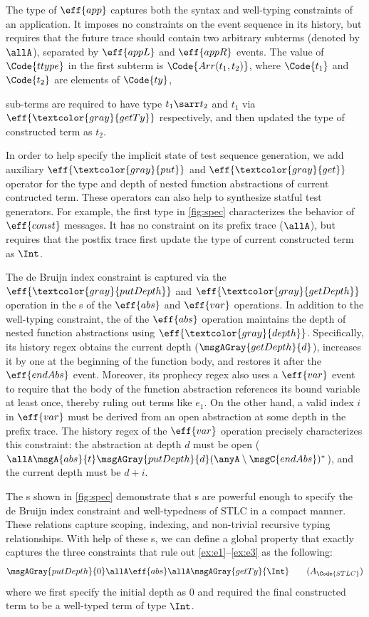 The type
of $\eff{app}$ captures
both the syntax and well-typing constraints of an application.
It imposes no constraints on the event sequence in its history,
but requires that the future trace should contain two arbitrary
subterms (denoted by $\allA$), separated by
$\eff{appL}$ and $\eff{appR}$ events.   The value of
$\Code{ttype}$ in the first subterm is $\Code{Arr(t_1,t_2)}$,
where $\Code{t_1}$ and $\Code{t_2}$ are elements of $\Code{ty}$,

sub-terms are required to have type $t_1\sarr t_2$ and $t_1$ via
$\eff{\textcolor{gray}{getTy}}$ respectively, and then updated the
type of constructed term as $t_2$.


In
order to help specify the implicit state of test sequence generation,
we add auxiliary $\eff{\textcolor{gray}{put}}$ and
$\eff{\textcolor{gray}{get}}$ operator for the type and depth of
nested function abstractions of current contructed term. These
operators can also help to synthesize statful test generators.  For
example, the first type in \autoref{fig:spec} characterizes the
behavior of $\eff{const}$ messages. It has no constraint on its prefix
trace ($\allA$), but requires that the postfix trace first update the
type of current constructed term as $\Int$.

The de Bruijn index constraint is captured via the $\eff{\textcolor{gray}{putDepth}}$ and $\eff{\textcolor{gray}{getDepth}}$ operation in the \PAT{}s of the $\eff{abs}$ and $\eff{var}$ operations. In addition to the well-typing constraint, the \PAT{} of the $\eff{abs}$ operation maintains the depth of nested function abstractions using $\eff{\textcolor{gray}{depth}}$. Specifically, its history regex obtains the current depth ($\msgAGray{getDepth}{d}$), increases it by one at the beginning of the function body, and restores it after the $\eff{endAbs}$ event. Moreover, its prophecy regex also uses a $\eff{var}$ event to require that the body of the function abstraction references its bound variable at least once, thereby ruling out terms like $e_1$.
On the other hand, a valid index $i$ in $\eff{var}$ must be derived from an open abstraction at some depth in the prefix trace. The history regex of the $\eff{var}$ operation precisely characterizes this constraint: the abstraction at depth $d$ must be open ($\allA\msgA{abs}{t}\msgAGray{putDepth}{d}(\anyA\setminus\msgC{endAbs})^*$), and the current depth must be $d + i$.

The \PAT{}s shown in \autoref{fig:spec} demonstrate that \PAT{}s are powerful enough to specify the de Bruijn index constraint and well-typedness of STLC in a compact manner. These relations capture scoping, indexing, and non-trivial recursive typing relationships. With help of these \PAT{}s, we can define a global property that exactly captures the three constraints that rule out \ref{ex:e1}--\ref{ex:e3} as the following:
\begin{align*}
  \msgAGray{putDepth}{0}\allA \eff{abs} \allA \msgAGray{getTy}{\Int} \label{prop:stlc}\tag{$A_\Code{STLC}$}
\end{align*}\noindent
where we first specify the initial depth as 0 and required the final constructed term to be a well-typed term of type $\Int$.

